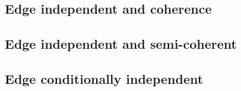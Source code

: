 

\subsection{Edge independent and coherence} %
\label{sub:edge_independent_and_coherence}



\subsection{Edge independent and semi-coherent} %
\label{sub:edge_independent_and_semi_coherent}


\subsection{Edge conditionally independent} %
\label{sub:edge_cond}


